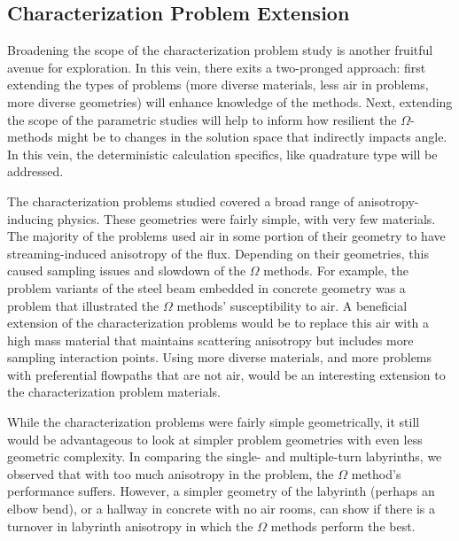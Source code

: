 \subsection{Characterization Problem Extension}
\label{subsec:extendcharprobs}

Broadening the scope
of the characterization problem study
is another fruitful avenue for exploration. In this
vein, there exits a two-pronged approach: first extending the types of problems
(more diverse materials, less air in problems, more diverse geometries) will
enhance knowledge of the methods. Next, extending the scope of the parametric
studies will help to inform how resilient the $\Omega$-methods might be to
changes in the solution space that indirectly impacts angle.
In this vein, the deterministic calculation specifics, like
quadrature type will be addressed.

The characterization problems studied covered a broad range of
anisotropy-inducing physics. These geometries were fairly simple, with very few
materials. The majority of the problems used air in some portion of their
geometry to have streaming-induced anisotropy of the flux. Depending on their
geometries, this caused sampling issues and slowdown of the $\Omega$ methods.
For example, the problem variants of the
steel beam embedded in concrete geometry was a
problem that illustrated the $\Omega$ methods' susceptibility to air. 
A
beneficial extension of the characterization problems would be to replace this
air with a high mass material that maintains scattering anisotropy but includes more
sampling interaction points. Using more diverse materials, and more problems
with preferential flowpaths that are not air, would be an interesting extension
to the characterization problem materials.

While the characterization problems were fairly simple geometrically, it still
would be advantageous to look at simpler problem geometries with even less
geometric complexity. In
comparing the single- and multiple-turn labyrinths, we observed that with too
much anisotropy in the problem, the $\Omega$ method's performance suffers.
However, a simpler
geometry of the labyrinth (perhaps an elbow bend), or a hallway in concrete with
no air rooms, can show if there is a turnover in labyrinth anisotropy in which
the $\Omega$ methods perform the best.

